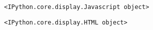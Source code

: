 \documentclass[11pt]{article}
\begin{document}
    
    \begin{verbatim}
<IPython.core.display.Javascript object>
    \end{verbatim}

    
    
    \begin{verbatim}
<IPython.core.display.HTML object>
    \end{verbatim}

    

    
    
    
    
\end{document}
